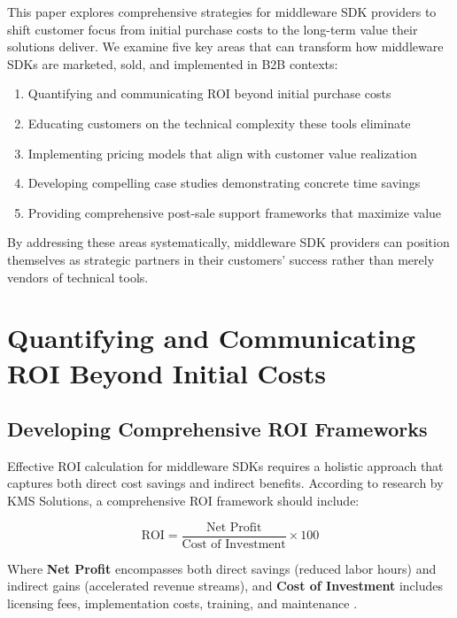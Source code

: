 \documentclass[11pt,a4paper]{article}
\begin{document}
This paper explores comprehensive strategies for middleware SDK providers to shift customer focus from initial purchase costs to the long-term value their solutions deliver. We examine five key areas that can transform how middleware SDKs are marketed, sold, and implemented in B2B contexts:

\begin{enumerate}
    \item Quantifying and communicating ROI beyond initial purchase costs
    \item Educating customers on the technical complexity these tools eliminate
    \item Implementing pricing models that align with customer value realization
    \item Developing compelling case studies demonstrating concrete time savings
    \item Providing comprehensive post-sale support frameworks that maximize value
\end{enumerate}

By addressing these areas systematically, middleware SDK providers can position themselves as strategic partners in their customers' success rather than merely vendors of technical tools.

\section{Quantifying and Communicating ROI Beyond Initial Costs}

\subsection{Developing Comprehensive ROI Frameworks}

Effective ROI calculation for middleware SDKs requires a holistic approach that captures both direct cost savings and indirect benefits. According to research by KMS Solutions, a comprehensive ROI framework should include:

\begin{equation}
\text{ROI} = \frac{\text{Net Profit}}{\text{Cost of Investment}} \times 100
\end{equation}

Where \textbf{Net Profit} encompasses both direct savings (reduced labor hours) and indirect gains (accelerated revenue streams), and \textbf{Cost of Investment} includes licensing fees, implementation costs, training, and maintenance \cite{kms2023}.
\end{document}
